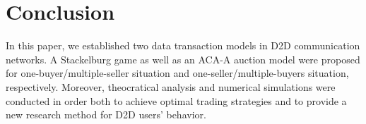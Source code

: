 \documentclass[11pt,draftcls]{IEEEtran}{\onecolumn}
\begin{document}
\section{Conclusion}

In this paper, we established two data transaction models in D2D communication networks. A Stackelburg game as well as an ACA-A auction model were proposed for one-buyer/multiple-seller situation and one-seller/multiple-buyers situation, respectively. Moreover, theocratical analysis and numerical simulations were conducted in order both to achieve optimal trading strategies and to provide a new research method for D2D users' behavior.










\end{document}
